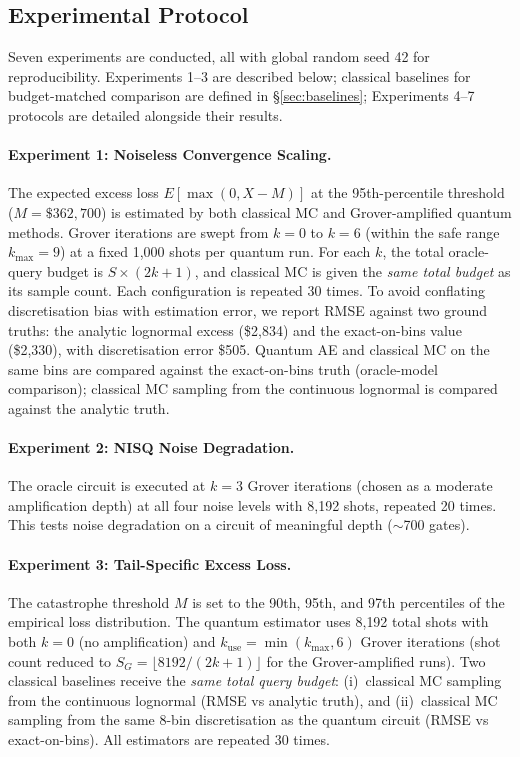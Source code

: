 \documentclass[11pt,a4paper]{article}
\begin{document}
\subsection{Experimental Protocol}

Seven experiments are conducted, all with global random seed 42 for reproducibility. Experiments 1--3 are described below; classical baselines for budget-matched comparison are defined in \S\ref{sec:baselines}; Experiments 4--7 protocols are detailed alongside their results.

\paragraph{Experiment 1: Noiseless Convergence Scaling.} The expected excess loss $E[\max(0, X - M)]$ at the 95th-percentile threshold ($M = \$362{,}700$) is estimated by both classical MC and Grover-amplified quantum methods. Grover iterations are swept from $k = 0$ to $k = 6$ (within the safe range $k_{\max} = 9$) at a fixed 1{,}000 shots per quantum run. For each $k$, the total oracle-query budget is $S \times (2k+1)$, and classical MC is given the \emph{same total budget} as its sample count. Each configuration is repeated 30 times. To avoid conflating discretisation bias with estimation error, we report RMSE against two ground truths: the analytic lognormal excess (\$2{,}834) and the exact-on-bins value (\$2{,}330), with discretisation error \$505. Quantum AE and classical MC on the same bins are compared against the exact-on-bins truth (oracle-model comparison); classical MC sampling from the continuous lognormal is compared against the analytic truth.

\paragraph{Experiment 2: NISQ Noise Degradation.} The oracle circuit is executed at $k = 3$ Grover iterations (chosen as a moderate amplification depth) at all four noise levels with 8{,}192 shots, repeated 20 times. This tests noise degradation on a circuit of meaningful depth ($\sim$700 gates).

\paragraph{Experiment 3: Tail-Specific Excess Loss.} The catastrophe threshold $M$ is set to the 90th, 95th, and 97th percentiles of the empirical loss distribution. The quantum estimator uses 8{,}192 total shots with both $k = 0$ (no amplification) and $k_{\text{use}} = \min(k_{\max}, 6)$ Grover iterations (shot count reduced to $S_G = \lfloor 8192 / (2k+1) \rfloor$ for the Grover-amplified runs). Two classical baselines receive the \emph{same total query budget}: (i)~classical MC sampling from the continuous lognormal (RMSE vs analytic truth), and (ii)~classical MC sampling from the same 8-bin discretisation as the quantum circuit (RMSE vs exact-on-bins). All estimators are repeated 30 times.
\end{document}

